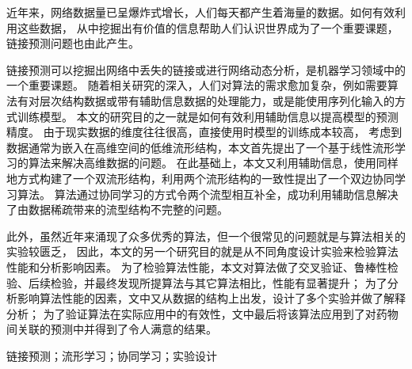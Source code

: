 

\begin{zhaiyao}

近年来，网络数据量已呈爆炸式增长，人们每天都产生着海量的数据。如何有效利用这些数据，
从中挖掘出有价值的信息帮助人们认识世界成为了一个重要课题，链接预测问题也由此产生。


链接预测可以挖掘出网络中丢失的链接或进行网络动态分析，是机器学习领域中的一个重要课题。
随着相关研究的深入，人们对算法的需求愈加复杂，例如需要算法有对层次结构数据或带有辅助信息数据的处理能力，或是能使用序列化输入的方式训练模型。
本文的研究目的之一就是如何有效利用辅助信息以提高模型的预测精度。
由于现实数据的维度往往很高，直接使用时模型的训练成本较高，
考虑到数据通常为嵌入在高维空间的低维流形结构，本文首先提出了一个基于线性流形学习的算法来解决高维数据的问题。
在此基础上，本文又利用辅助信息，使用同样地方式构建了一个双流形结构，利用两个流形结构的一致性提出了一个双边协同学习算法。
算法通过协同学习的方式令两个流型相互补全，成功利用辅助信息解决了由数据稀疏带来的流型结构不完整的问题。


此外，虽然近年来涌现了众多优秀的算法，但一个很常见的问题就是与算法相关的实验较匮乏，
因此，本文的另一个研究目的就是从不同角度设计实验来检验算法性能和分析影响因素。
为了检验算法性能，本文对算法做了交叉验证、鲁棒性检验、后续检验，并最终发现所提算法与其它算法相比，性能有显著提升；
为了分析影响算法性能的因素，文中又从数据的结构上出发，设计了多个实验并做了解释分析；
为了验证算法在实际应用中的有效性，文中最后将该算法应用到了对药物间关联的预测中并得到了令人满意的结果。
\end{zhaiyao}


\vspace{20pt}

\begin{guanjianci}
链接预测；流形学习；协同学习；实验设计
\end{guanjianci}



